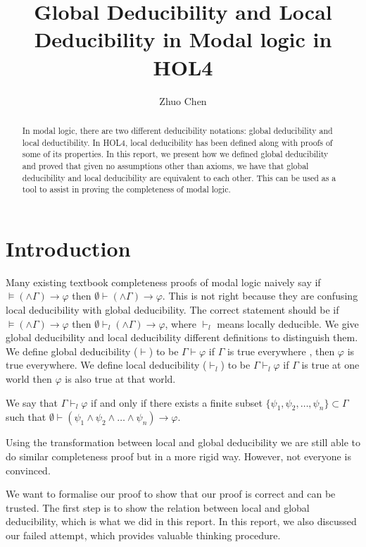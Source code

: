\documentclass[submission,copyright,creativecommons]{eptcs}
\title{Global Deducibility and Local Deducibility in Modal logic in HOL4}
\author{Zhuo Chen
\institute{
University of Australian National University\\
Canberra, Australia}
\email{zhuo.chen1@anu.edu.au}
}
\begin{document}
\maketitle

\begin{abstract}
In modal logic, there are two different deducibility notations: global deducibility 
and local deductibility. In HOL4, local deducibility has been defined along with proofs 
of some of its properties. In this report, we present how we defined global deducibility
and proved that given no assumptions other than axioms, we have that global deducibility and local deducibility
are equivalent to each other. This can be used as a tool to assist in proving the completeness 
of modal logic. 
\end{abstract}

\section{Introduction}

Many existing textbook completeness proofs of modal logic naively say if $\models (\wedge \Gamma) \rightarrow \varphi$ 
then $\emptyset \vdash (\wedge \Gamma) \rightarrow \varphi$. 
This is not right because they are confusing local deducibility with 
global deducibility. The correct statement should be if
$\models (\wedge \Gamma) \rightarrow \varphi$ 
then $\emptyset \vdash_l (\wedge \Gamma) \rightarrow \varphi$,
where $\vdash_l$ means locally deducible. 
We give global deducibility and local deducibility different definitions 
to distinguish them.
We define global deducibility ($\vdash$) to be $\Gamma \vdash \varphi$ if $\Gamma$ is true everywhere
, then $\varphi$ is true everywhere.
We define local deducibility ($\vdash_l$) to be $\Gamma \vdash_l \varphi$ 
if $\Gamma$ is true at one world then $\varphi$ is also true at that world.

We say that $\Gamma \vdash_l \varphi$ if and only if there exists a 
finite subset $\{\psi_1, \psi_2,\dots, \psi_n\} \subset \Gamma$ 
such that $\emptyset \vdash (\psi_1 \wedge \psi_2 \wedge \dots \wedge \psi_n) \rightarrow \varphi$.


Using the transformation between local and global deducibility we 
are still able to do similar completeness proof but in a more rigid way. However, not everyone is convinced.

We want to formalise our proof to show that our proof is correct and 
can be trusted. The first step is to show the relation between local and global deducibility,
which is what we did in this report. 
In this report, we also discussed our failed attempt, which provides 
valuable thinking procedure. 
\end{document}
